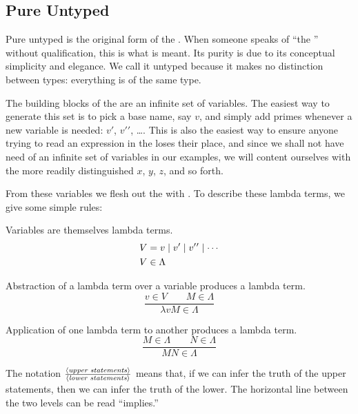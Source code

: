 \subsection{Pure Untyped \LambdaCalc}
Pure untyped \lambdacalc is the original form of the \lambdacalc{}. When someone speaks of ``the \lambdacalc{}'' without qualification, this is what is meant. Its purity is due to its conceptual simplicity and elegance. We call it untyped because it makes no distinction between types: everything is of the same type.

The building blocks of the \lambdacalc are an infinite set of variables. The easiest way to generate this set is to pick a base name, say $v$, and simply add primes whenever a new variable is needed: $v\prime$, $v\prime\prime$, \dots. This is also the easiest way to ensure anyone trying to read an expression in the \lambdacalc loses their place, and since we shall not have need of an infinite set of variables in our examples, we will content ourselves with the more readily distinguished $x$, $y$, $z$, and so forth.

From these variables we flesh out the \lambdacalc with . To describe these lambda terms, we give some simple rules:
\begin{aenumerate}
\item Variables are themselves lambda terms.
\begin{align*}
V &= v \alt v\prime \alt v\prime\prime \alt \dotsb\\
V &\in \Lambda
\end{align*}
\item Abstraction of a lambda term over a variable produces a lambda term.
\[
\frac{v \in V\qquad M \in \Lambda}{\lambda v M \in \Lambda}
\]
\item Application of one lambda term to another produces a lambda term.
\[
\frac{M \in \Lambda\qquad N \in \Lambda}{M N \in \Lambda}
\]
\end{aenumerate}
The notation $\frac{\langle\text{\textit{upper statements}}\rangle}{\langle\text{\textit{lower statements}}\rangle}$ means that, if we can infer the truth of the upper statements, then we can infer the truth of the lower. The horizontal line between the two levels can be read ``implies.''


